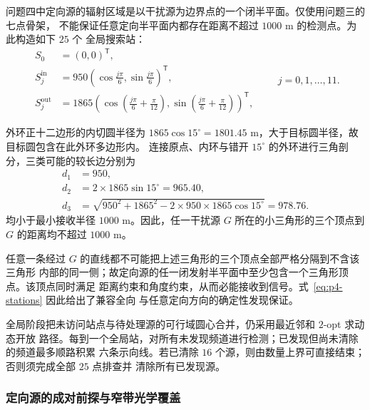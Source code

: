 问题四中定向源的辐射区域是以干扰源为边界点的一个闭半平面。仅使用问题三的七点骨架，
不能保证任意定向半平面内都存在距离不超过 $1000$ m 的检测点。为此构造如下 $25$ 个
全局搜索站：
\begin{equation}
\begin{aligned}
S_0&=(0,0)^{\mathsf T},\\
S_j^{\mathrm{in}}&=950
\left(\cos\frac{j\pi}{6},\sin\frac{j\pi}{6}\right)^{\mathsf T},\\
S_j^{\mathrm{out}}&=1865
\left(\cos\left(\frac{j\pi}{6}+\frac{\pi}{12}\right),
\sin\left(\frac{j\pi}{6}+\frac{\pi}{12}\right)\right)^{\mathsf T},
\end{aligned}
\qquad j=0,1,\ldots,11.
\label{eq:p4-stations}
\end{equation}

外环正十二边形的内切圆半径为
$1865\cos15^\circ=1801.45$ m，大于目标圆半径，故目标圆包含在此外环多边形内。
连接原点、内环与错开 $15^\circ$ 的外环进行三角剖分，三类可能的较长边分别为
\begin{equation}
\begin{aligned}
d_1&=950,\\
d_2&=2\times1865\sin15^\circ=965.40,\\
d_3&=\sqrt{950^2+1865^2-2\times950\times1865\cos15^\circ}=978.76.
\end{aligned}
\end{equation}
均小于最小接收半径 $1000$ m。因此，任一干扰源 $G$ 所在的小三角形的三个顶点到
$G$ 的距离均不超过 $1000$ m。

任意一条经过 $G$ 的直线都不可能把上述三角形的三个顶点全部严格分隔到不含该三角形
内部的同一侧；故定向源的任一闭发射半平面中至少包含一个三角形顶点。该顶点同时满足
距离约束和角度约束，从而必能接收到信号。式~\eqref{eq:p4-stations} 因此给出了兼容全向
与任意定向方向的确定性发现保证。


全局阶段把未访问站点与待处理源的可行域圆心合并，仍采用最近邻和 $2$-opt 求动态开放
路径。每到一个全局站，对所有未发现频道进行检测；已发现但尚未清除的频道最多顺路积累
六条示向线。若已清除 $16$ 个源，则由数量上界可直接结束；否则须完成全部 $25$ 点排查并
清除所有已发现源。

\subsubsection{定向源的成对前探与窄带光学覆盖}

